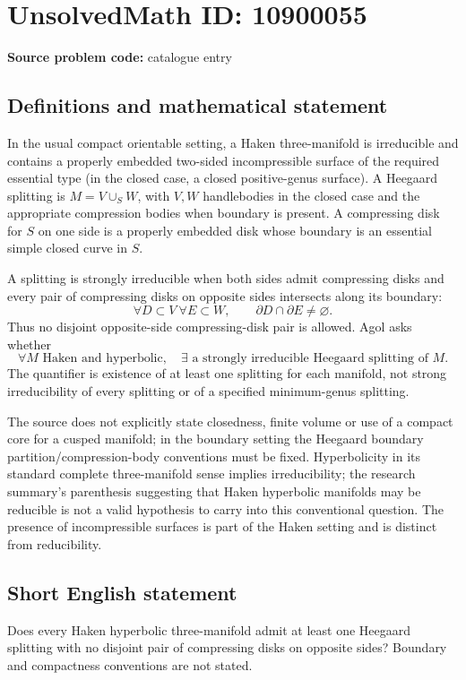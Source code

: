 \documentclass[11pt]{article}
\begin{document}
\section*{UnsolvedMath ID: 10900055}
\textbf{Source problem code:} catalogue entry
\subsection{Definitions and mathematical statement}
In the usual compact orientable setting, a Haken three-manifold is irreducible and contains a properly embedded two-sided incompressible surface of the required essential type (in the closed case, a closed positive-genus surface). A Heegaard splitting is \(M=V\cup_S W\), with \(V,W\) handlebodies in the closed case and the appropriate compression bodies when boundary is present. A compressing disk for \(S\) on one side is a properly embedded disk whose boundary is an essential simple closed curve in \(S\).

A splitting is strongly irreducible when both sides admit compressing disks and every pair of compressing disks on opposite sides intersects along its boundary:
\[\forall D\subset V\ \forall E\subset W,\qquad \partial D\cap\partial E\ne\varnothing.\]
Thus no disjoint opposite-side compressing-disk pair is allowed. Agol asks whether
\[\forall M\text{ Haken and hyperbolic},\quad
\exists\text{ a strongly irreducible Heegaard splitting of }M.\]
The quantifier is existence of at least one splitting for each manifold, not strong irreducibility of every splitting or of a specified minimum-genus splitting.

The source does not explicitly state closedness, finite volume or use of a compact core for a cusped manifold; in the boundary setting the Heegaard boundary partition/compression-body conventions must be fixed. Hyperbolicity in its standard complete three-manifold sense implies irreducibility; the research summary's parenthesis suggesting that Haken hyperbolic manifolds may be reducible is not a valid hypothesis to carry into this conventional question. The presence of incompressible surfaces is part of the Haken setting and is distinct from reducibility.
\subsection{Short English statement}
Does every Haken hyperbolic three-manifold admit at least one Heegaard splitting with no disjoint pair of compressing disks on opposite sides? Boundary and compactness conventions are not stated.
\end{document}
